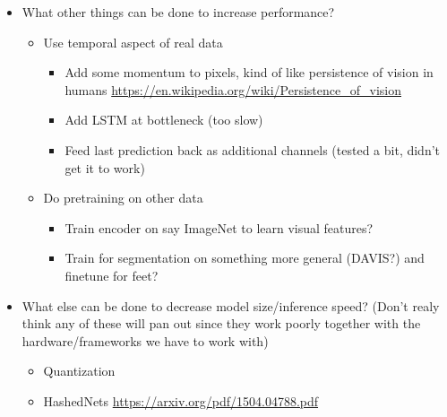 \documentclass[11pt]{article}
\begin{document}
\begin{itemize}
\begin{itemize}
\begin{itemize}
\end{itemize}
\end{itemize}
\item What other things can be done to increase performance?
\begin{itemize}
\item Use temporal aspect of real data
\begin{itemize}
\item Add some momentum to pixels, kind of like persistence of vision in humans \url{https://en.wikipedia.org/wiki/Persistence\_of\_vision}
\item Add LSTM at bottleneck (too slow)
\item Feed last prediction back as additional channels (tested a bit, didn't get it to work)
\end{itemize}
\item Do pretraining on other data
\begin{itemize}
\item Train encoder on say ImageNet to learn visual features?
\item Train for segmentation on something more general (DAVIS?) and finetune for feet?
\end{itemize}
\end{itemize}
\item What else can be done to decrease model size/inference speed? (Don't realy think any of these will pan out since they work poorly together with the hardware/frameworks we have to work with)
\begin{itemize}
\item Quantization
\item HashedNets \url{https://arxiv.org/pdf/1504.04788.pdf}
\end{itemize}
\end{itemize}
\end{document}
